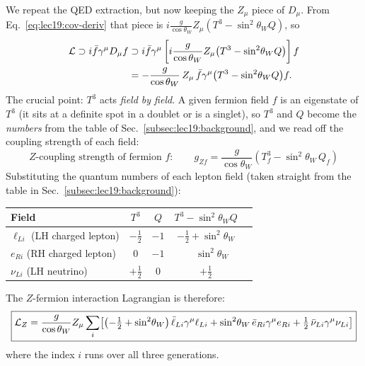We repeat the QED extraction, but now keeping the $Z_\mu$ piece of
$D_\mu$. From Eq.~\eqref{eq:lec19:cov-deriv} that piece is
$i\frac{g}{\cos\theta_W}Z_\mu(T^3-\sin^2\!\theta_W Q)$, so
\begin{align}
  \mathcal{L} \supset i\bar f\gamma^\mu D_\mu f
  &\supset i\bar f\gamma^\mu
    \left[i\frac{g}{\cos\theta_W}Z_\mu\bigl(T^3-\sin^2\!\theta_W Q\bigr)\right]f
  \notag\\
  &= -\frac{g}{\cos\theta_W}\,Z_\mu\,
     \bar f\gamma^\mu\bigl(T^3-\sin^2\!\theta_W Q\bigr)f .
  \label{eq:lec19:z-extraction}
\end{align}
The crucial point: $T^3$ acts \emph{field by field}. A given fermion
field $f$ is an eigenstate of $T^3$ (it sits at a definite spot in a
doublet or is a singlet), so $T^3$ and $Q$ become the \emph{numbers}
from the table of Sec.~\ref{subsec:lec19:background}, and we read off
the coupling strength of each field:
\begin{equation}
  \boxed{
    \text{$Z$-coupling strength of fermion }f:
    \qquad
    g_{Zf} = \frac{g}{\cos\theta_W}\!\left(T^3_f - \sin^2\!\theta_W\,Q_f\right)
  }
  \label{eq:lec19:z-coupling-formula}
\end{equation}
Substituting the quantum numbers of each lepton field (taken straight
from the table in Sec.~\ref{subsec:lec19:background}):

\begin{center}
\renewcommand{\arraystretch}{1.3}
\begin{tabular}{@{}lcccc@{}}
  \toprule
  Field & $T^3$ & $Q$ & $T^3 - \sin^2\!\theta_W Q$ \\
  \midrule
  $\ell_{Li}$ (LH charged lepton) & $-\tfrac12$ & $-1$ & $-\tfrac12 + \sin^2\!\theta_W$\\
  $e_{Ri}$ (RH charged lepton) & $0$ & $-1$ & $\phantom{-}\sin^2\!\theta_W$\\
  $\nu_{Li}$ (LH neutrino) & $+\tfrac12$ & $0$ & $+\tfrac12$\\
  \bottomrule
\end{tabular}
\end{center}

The $Z$-fermion interaction Lagrangian is therefore:
\begin{equation}
  \boxed{
    \mathcal{L}_Z = \frac{g}{\cos\theta_W} Z_\mu\sum_i
    \!\left[
      \left(-\tfrac12+\sin^2\!\theta_W\right)\bar\ell_{Li}\gamma^\mu\ell_{Li}
      + \sin^2\!\theta_W\,\bar e_{Ri}\gamma^\mu e_{Ri}
      + \tfrac12\,\bar\nu_{Li}\gamma^\mu\nu_{Li}
    \right]
  }
  \label{eq:lec19:z-interaction}
\end{equation}
where the index $i$ runs over all three generations.

